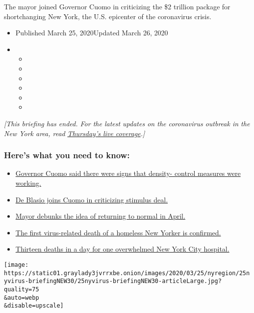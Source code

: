 The mayor joined Governor Cuomo in criticizing the \$2 trillion package
for shortchanging New York, the U.S. epicenter of the coronavirus
crisis.

\begin{itemize}
\item
  Published March 25, 2020Updated March 26, 2020
\item
  \begin{itemize}
  \item
  \item
  \item
  \item
  \item
  \item
  \end{itemize}
\end{itemize}

\emph{{[}This briefing has ended. For the latest updates on the
coronavirus outbreak in the New York area, read}
\href{https://www.nytimes3xbfgragh.onion/2020/03/26/nyregion/coronavirus-new-york-update.html}{\emph{Thursday's
live coverage}}\emph{.{]}}

\hypertarget{heres-what-you-need-to-know}{%
\subsubsection{Here's what you need to
know:}\label{heres-what-you-need-to-know}}

\begin{itemize}
\tightlist
\item
  \protect\hyperlink{link-59a718bd}{Governor Cuomo said there were signs
  that density- control measures were working.}
\item
  \protect\hyperlink{link-2040bb61}{De Blasio joins Cuomo in criticizing
  stimulus deal. }
\item
  \protect\hyperlink{link-3c396e05}{Mayor debunks the idea of returning
  to normal in April.}
\item
  \protect\hyperlink{link-1048ef68}{The first virus-related death of a
  homeless New Yorker is confirmed.}
\item
  \protect\hyperlink{link-17e20485}{Thirteen deaths in a day for one
  overwhelmed New York City hospital.}
\end{itemize}

\texttt{[image: https://static01.graylady3jvrrxbe.onion/images/2020/03/25/nyregion/25nyvirus-briefingNEW30/25nyvirus-briefingNEW30-articleLarge.jpg?quality=75\\\&auto=webp\\\&disable=upscale]}

